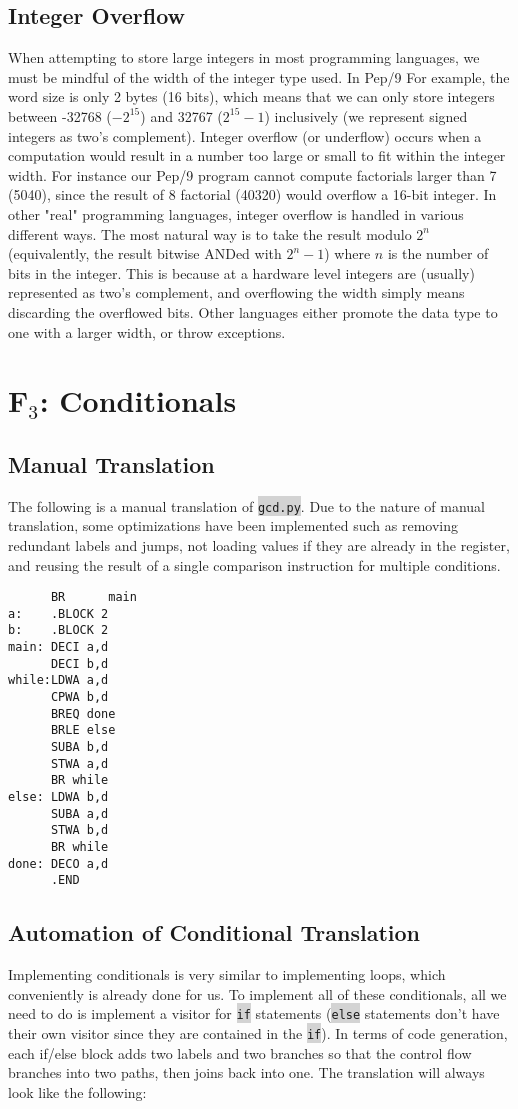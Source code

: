 \documentclass[12pt]{article}
\newcommand{\code}[1]{\colorbox{LightGray}{\texttt{#1}}}
\begin{document}
\subsection*{Integer Overflow}
When attempting to store large integers in most programming languages, we must be mindful of the width of the integer type used. In Pep/9 For example, the word size is only 2 bytes (16 bits), which means that we can only store integers between -32768 ($-2^{15}$) and 32767 ($2^{15}-1$) inclusively (we represent signed integers as two's complement). Integer overflow (or underflow) occurs when a computation would result in a number too large or small to fit within the integer width. For instance our Pep/9 program cannot compute factorials larger than 7 (5040), since the result of 8 factorial (40320) would overflow a 16-bit integer. In other "real" programming languages, integer overflow is handled in various different ways. The most natural way is to take the result modulo $2^{n}$ (equivalently, the result bitwise ANDed with $2^{n}-1$) where $n$ is the number of bits in the integer. This is because at a hardware level integers are (usually) represented as two's complement, and overflowing the width simply means discarding the overflowed bits. Other languages either promote the data type to one with a larger width, or throw exceptions.

\section*{F$_3$: Conditionals}
\subsection*{Manual Translation}
The following is a manual translation of \code{gcd.py}. Due to the nature of manual translation, some optimizations have been implemented such as removing redundant labels and jumps, not loading values if they are already in the register, and reusing the result of a single comparison instruction for multiple conditions.
\begin{verbatim}
      BR      main
a:    .BLOCK 2
b:    .BLOCK 2
main: DECI a,d
      DECI b,d
while:LDWA a,d
      CPWA b,d
      BREQ done
      BRLE else
      SUBA b,d
      STWA a,d
      BR while
else: LDWA b,d
      SUBA a,d
      STWA b,d
      BR while
done: DECO a,d 
      .END
\end{verbatim}

\subsection*{Automation of Conditional Translation}
Implementing conditionals is very similar to implementing loops, which conveniently is already done for us. To implement all of these conditionals, all we need to do is implement a visitor for \code{if} statements (\code{else} statements don't have their own visitor since they are contained in the \code{if}). In terms of code generation, each if/else block adds two labels and two branches so that the control flow branches into two paths, then joins back into one. The translation will always look like the following:
\end{document}
